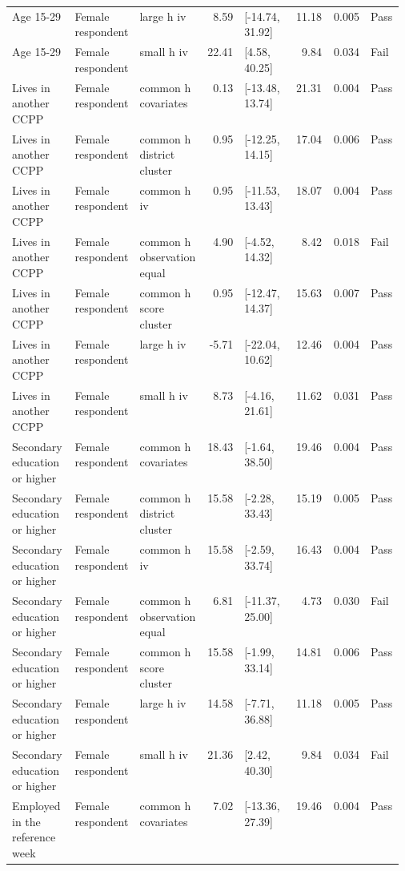 \begin{longtable}{@{}p{0.16\linewidth}p{0.14\linewidth}p{0.14\linewidth}rp{0.13\linewidth}rrl@{}}
Age 15-29 & Female respondent & large h iv & 8.59 & [-14.74, 31.92] & 11.18 & 0.005 & Pass \\
Age 15-29 & Female respondent & small h iv & 22.41 & [4.58, 40.25] & 9.84 & 0.034 & Fail \\
Lives in another CCPP & Female respondent & common h covariates & 0.13 & [-13.48, 13.74] & 21.31 & 0.004 & Pass \\
Lives in another CCPP & Female respondent & common h district cluster & 0.95 & [-12.25, 14.15] & 17.04 & 0.006 & Pass \\
Lives in another CCPP & Female respondent & common h iv & 0.95 & [-11.53, 13.43] & 18.07 & 0.004 & Pass \\
Lives in another CCPP & Female respondent & common h observation equal & 4.90 & [-4.52, 14.32] & 8.42 & 0.018 & Fail \\
Lives in another CCPP & Female respondent & common h score cluster & 0.95 & [-12.47, 14.37] & 15.63 & 0.007 & Pass \\
Lives in another CCPP & Female respondent & large h iv & -5.71 & [-22.04, 10.62] & 12.46 & 0.004 & Pass \\
Lives in another CCPP & Female respondent & small h iv & 8.73 & [-4.16, 21.61] & 11.62 & 0.031 & Pass \\
Secondary education or higher & Female respondent & common h covariates & 18.43 & [-1.64, 38.50] & 19.46 & 0.004 & Pass \\
Secondary education or higher & Female respondent & common h district cluster & 15.58 & [-2.28, 33.43] & 15.19 & 0.005 & Pass \\
Secondary education or higher & Female respondent & common h iv & 15.58 & [-2.59, 33.74] & 16.43 & 0.004 & Pass \\
Secondary education or higher & Female respondent & common h observation equal & 6.81 & [-11.37, 25.00] & 4.73 & 0.030 & Fail \\
Secondary education or higher & Female respondent & common h score cluster & 15.58 & [-1.99, 33.14] & 14.81 & 0.006 & Pass \\
Secondary education or higher & Female respondent & large h iv & 14.58 & [-7.71, 36.88] & 11.18 & 0.005 & Pass \\
Secondary education or higher & Female respondent & small h iv & 21.36 & [2.42, 40.30] & 9.84 & 0.034 & Fail \\
Employed in the reference week & Female respondent & common h covariates & 7.02 & [-13.36, 27.39] & 19.46 & 0.004 & Pass \\

\end{longtable}
